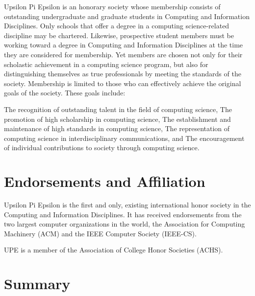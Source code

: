 \documentclass{article}
\begin{document}
Upsilon Pi Epsilon is an honorary society whose membership consists of outstanding undergraduate and graduate students in Computing and Information Disciplines. Only schools that offer a degree in a computing science-related discipline may be chartered. Likewise, prospective student members must be working toward a degree in Computing and Information Disciplines at the time they are considered for membership. Yet members are chosen not only for their scholastic achievement in a computing science program, but also for distinguishing themselves as true professionals by meeting the standards of the society. Membership is limited to those who can effectively achieve the original goals of the society. These goals include:

    The recognition of outstanding talent in the field of computing science,
    The promotion of high scholarship in computing science,
    The establishment and maintenance of high standards in computing science,
    The representation of computing science in interdisciplinary communications, and
    The encouragement of individual contributions to society through computing science.

\section{Endorsements and Affiliation}

Upsilon Pi Epsilon is the first and only, existing international honor society in the Computing and Information Disciplines. It has received endorsements from the two largest computer organizations in the world, the Association for Computing Machinery (ACM) and the IEEE Computer Society (IEEE-CS).

UPE is a member of the Association of College Honor Societies (ACHS).

\section{Summary}
\end{document}
